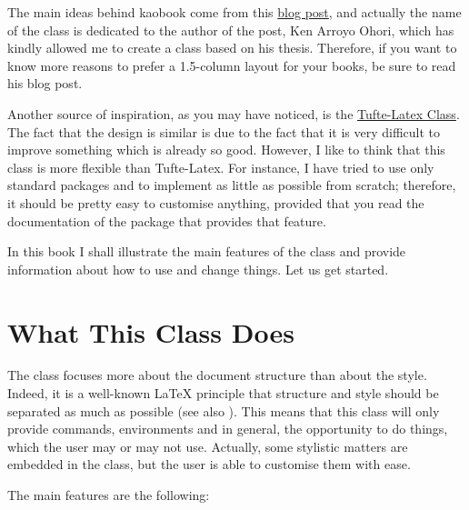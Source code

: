 The main ideas behind kaobook come from this 
\href{https://3d.bk.tudelft.nl/ken/en/2016/04/17/a-1.5-column-layout-in-latex.html}{blog 
	post}, and actually the name of the class is dedicated to the author 
of the post, Ken Arroyo Ohori, which has kindly allowed me to create a 
class based on his thesis. Therefore, if you want to know more reasons 
to prefer a 1.5-column layout for your books, be sure to read his blog 
post.

Another source of inspiration, as you may have noticed, is the 
\href{https://github.com/Tufte-LaTeX/tufte-latex}{Tufte-Latex Class}. 
The fact that the design is similar is due to the fact that it is very 
difficult to improve something which is already so good. However, I like 
to think that this class is more flexible than Tufte-Latex. For 
instance, I have tried to use only standard packages and to implement as 
little as possible from scratch; therefore, it should be pretty easy 
to customise anything, provided that you read the documentation of the 
package that provides that feature.

In this book I shall illustrate the main features of the class and 
provide information about how to use and change things. Let us get 
started.

\section{What This Class Does}

The  class focuses more about the document structure than 
about the style. Indeed, it is a well-known \LaTeX\xspace principle that 
structure and style should be separated as much as possible (see also 
). This means that this class will only provide 
commands, environments and in general, the opportunity to do things, 
which the user may or may not use. Actually, some stylistic matters are 
embedded in the class, but the user is able to customise them with ease.

The main features are the following:


